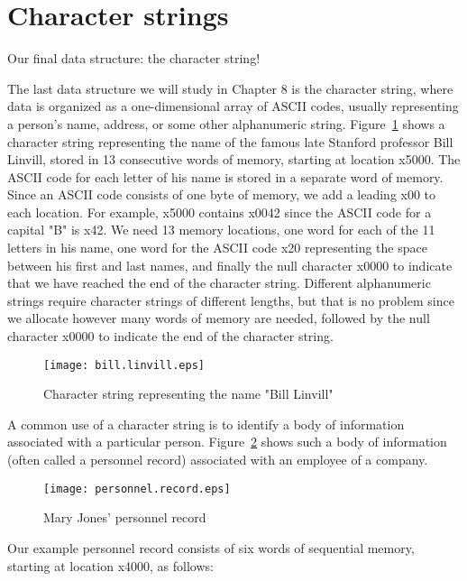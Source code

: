 \documentclass{patt}
\begin{document}
\FloatBarrier
\section{Character strings}

Our final data structure: the character string!

The last data structure we will study in Chapter 8 is the character string, 
where data is organized as a one-dimensional array of ASCII codes, usually
representing a person's name, address, or some other alphanumeric string.
Figure~\ref{fig:bill.linvill} shows a character 
string representing the name of the famous late Stanford professor Bill Linvill,
stored in 13 consecutive words of memory, starting at location x5000.  The 
ASCII code for each letter of his name is stored in a separate word of memory.
Since an ASCII code consists of one byte of memory, we add a leading x00 to 
each location.  For example, x5000 contains x0042 since the ASCII code for a 
capital "B" is x42.  We need 13 memory locations, one word for each of the 11 
letters in his name, one word for the ASCII code x20 representing the space 
between his first and last names, and finally the null character x0000 to 
indicate that we have reached the end of the character string.  Different 
alphanumeric strings require character strings of different lengths, but 
that is no problem since we allocate however many words of memory are needed, 
followed by the null character x0000 to indicate the end of the 
character string.

\begin{figure}[h]
\centerline{\texttt{[image: bill.linvill.eps]}}
\caption{Character string representing the name "Bill Linvill"}
\label{fig:bill.linvill}
\end{figure}

\FloatBarrier
A common use of a character string is to identify a body of information
associated with a particular person.  Figure~\ref{fig:personnel.record} shows 
such a body of information (often called a personnel record) associated with 
an employee of a company.  

\begin{figure}[h]
\centerline{\texttt{[image: personnel.record.eps]}}
\caption{Mary Jones' personnel record}
\label{fig:personnel.record}
\end{figure}

\FloatBarrier
Our example personnel record consists of six words of sequential memory, 
starting at location x4000, as follows:
\end{document}
